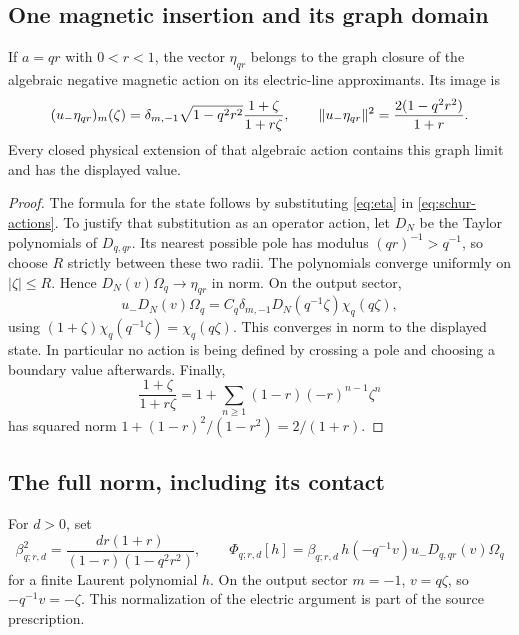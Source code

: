\subsection{One magnetic insertion and its graph domain}
\begin{lemma}\label{lem:one-magnetic}
If $a=qr$ with $0<r<1$, the vector $\eta_{qr}$ belongs to the graph
closure of the algebraic negative magnetic action on its electric-line
approximants. Its image is
\begin{equation}\label{eq:magnetic-state}
 (u_-\eta_{qr})_m(\zeta)
 =\delta_{m,-1}\sqrt{1-q^2r^2}\frac{1+\zeta}{1+r\zeta},
 \qquad
 \lVert u_-\eta_{qr}\rVert^2=\frac{2(1-q^2r^2)}{1+r}.
\end{equation}
Every closed physical extension of that algebraic action contains this
graph limit and has the displayed value.
\end{lemma}
\begin{proof}
The formula for the state follows by substituting \eqref{eq:eta} in
\eqref{eq:schur-actions}. To justify that substitution as an operator
action, let $D_N$ be the Taylor polynomials of $D_{q,qr}$.
Its nearest possible pole has modulus $(qr)^{-1}>q^{-1}$, so choose
$R$ strictly between these two radii. The polynomials converge uniformly
on $|\zeta|\leq R$. Hence $D_N(v)\Omega_q\to\eta_{qr}$ in norm.
On the output sector,
\begin{equation}\label{eq:graph-cancellation}
 u_-D_N(v)\Omega_q
 =C_q\delta_{m,-1}D_N(q^{-1}\zeta)\chi_q(q\zeta),
\end{equation}
using $(1+\zeta)\chi_q(q^{-1}\zeta)=\chi_q(q\zeta)$.
This converges in norm to the displayed state. In particular no action
is being defined by crossing a pole and choosing a boundary value
afterwards. Finally,
\begin{equation}\label{eq:magnetic-coeff}
 \frac{1+\zeta}{1+r\zeta}
 =1+\sum_{n\geq1}(1-r)(-r)^{n-1}\zeta^n
\end{equation}
has squared norm $1+(1-r)^2/(1-r^2)=2/(1+r)$.
\end{proof}

\subsection{The full norm, including its contact}
For $d>0$, set
\begin{equation}\label{eq:beta}
 \beta_{q;r,d}^2=
 \frac{dr(1+r)}{(1-r)(1-q^2r^2)},\qquad
 \Phi_{q;r,d}[h]
 =\beta_{q;r,d}\,h(-q^{-1}v)u_-D_{q,qr}(v)\Omega_q
\end{equation}
for a finite Laurent polynomial $h$. On the output sector $m=-1$,
$v=q\zeta$, so $-q^{-1}v=-\zeta$. This normalization of the
electric argument is part of the source prescription.

